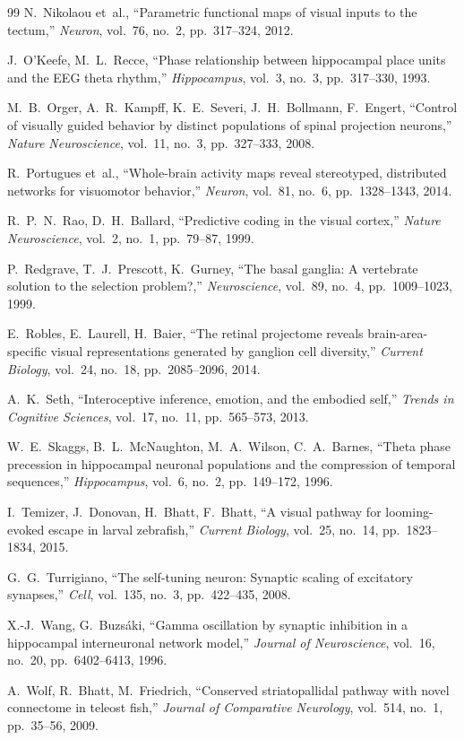 \documentclass[11pt,a4paper]{article}
\begin{document}
\begin{thebibliography}{99}
  N.~Nikolaou et~al.,
  ``Parametric functional maps of visual inputs to the tectum,''
  \textit{Neuron}, vol.~76, no.~2, pp.~317--324, 2012.

  J.~O'Keefe, M.~L.~Recce,
  ``Phase relationship between hippocampal place units and the EEG theta rhythm,''
  \textit{Hippocampus}, vol.~3, no.~3, pp.~317--330, 1993.

  M.~B.~Orger, A.~R.~Kampff, K.~E.~Severi, J.~H.~Bollmann, F.~Engert,
  ``Control of visually guided behavior by distinct populations of spinal
  projection neurons,''
  \textit{Nature Neuroscience}, vol.~11, no.~3, pp.~327--333, 2008.

  R.~Portugues et~al.,
  ``Whole-brain activity maps reveal stereotyped, distributed networks for
  visuomotor behavior,''
  \textit{Neuron}, vol.~81, no.~6, pp.~1328--1343, 2014.

  R.~P.~N.~Rao, D.~H.~Ballard,
  ``Predictive coding in the visual cortex,''
  \textit{Nature Neuroscience}, vol.~2, no.~1, pp.~79--87, 1999.

  P.~Redgrave, T.~J.~Prescott, K.~Gurney,
  ``The basal ganglia: A vertebrate solution to the selection problem?,''
  \textit{Neuroscience}, vol.~89, no.~4, pp.~1009--1023, 1999.

  E.~Robles, E.~Laurell, H.~Baier,
  ``The retinal projectome reveals brain-area-specific visual representations
  generated by ganglion cell diversity,''
  \textit{Current Biology}, vol.~24, no.~18, pp.~2085--2096, 2014.

  A.~K.~Seth,
  ``Interoceptive inference, emotion, and the embodied self,''
  \textit{Trends in Cognitive Sciences}, vol.~17, no.~11, pp.~565--573, 2013.

  W.~E.~Skaggs, B.~L.~McNaughton, M.~A.~Wilson, C.~A.~Barnes,
  ``Theta phase precession in hippocampal neuronal populations and the
  compression of temporal sequences,''
  \textit{Hippocampus}, vol.~6, no.~2, pp.~149--172, 1996.

  I.~Temizer, J.~Donovan, H.~Bhatt, F.~Bhatt,
  ``A visual pathway for looming-evoked escape in larval zebrafish,''
  \textit{Current Biology}, vol.~25, no.~14, pp.~1823--1834, 2015.

  G.~G.~Turrigiano,
  ``The self-tuning neuron: Synaptic scaling of excitatory synapses,''
  \textit{Cell}, vol.~135, no.~3, pp.~422--435, 2008.

  X.-J.~Wang, G.~Buzs\'{a}ki,
  ``Gamma oscillation by synaptic inhibition in a hippocampal interneuronal
  network model,''
  \textit{Journal of Neuroscience}, vol.~16, no.~20, pp.~6402--6413, 1996.

  A.~Wolf, R.~Bhatt, M.~Friedrich,
  ``Conserved striatopallidal pathway with novel connectome in teleost fish,''
  \textit{Journal of Comparative Neurology}, vol.~514, no.~1, pp.~35--56, 2009.

\end{thebibliography}
\end{document}
